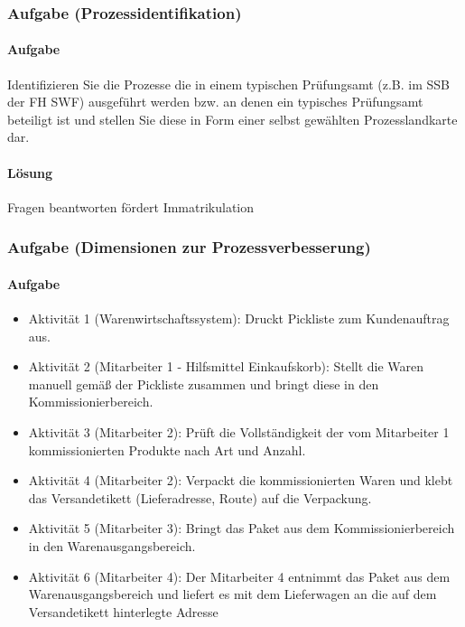 \subsubsection*{Aufgabe (Prozessidentifikation)}
\paragraph*{Aufgabe}
    Identifizieren Sie die Prozesse die in einem typischen Prüfungsamt (z.B. im SSB der FH SWF) ausgeführt werden bzw. an denen ein typisches Prüfungsamt beteiligt ist und stellen Sie diese in Form einer selbst gewählten Prozesslandkarte dar.
   
\paragraph*{Lösung}
    Fragen beantworten \textrightarrow fördert \textrightarrow Immatrikulation


\subsubsection*{Aufgabe (Dimensionen zur Prozessverbesserung)}
\paragraph*{Aufgabe}
    \begin{itemize}
        \item Aktivität 1 (Warenwirtschaftssystem): Druckt Pickliste zum Kundenauftrag aus.
        \item Aktivität 2 (Mitarbeiter 1 - Hilfsmittel Einkaufskorb): Stellt die Waren manuell gemäß der Pickliste zusammen und bringt diese in den Kommissionierbereich.
        \item Aktivität 3 (Mitarbeiter 2): Prüft die Vollständigkeit der vom Mitarbeiter 1 kommissionierten Produkte nach Art und Anzahl.
        \item Aktivität 4 (Mitarbeiter 2): Verpackt die kommissionierten Waren und klebt das Versandetikett (Lieferadresse, Route) auf die Verpackung.
        \item Aktivität 5 (Mitarbeiter 3): Bringt das Paket aus dem Kommissionierbereich in den Warenausgangsbereich.
        \item Aktivität 6 (Mitarbeiter 4): Der Mitarbeiter 4 entnimmt das Paket aus dem Warenausgangsbereich und liefert es mit dem Lieferwagen an die auf dem Versandetikett hinterlegte Adresse
    \end{itemize}

